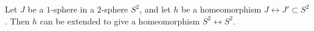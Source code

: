 Let $J$ be a $1$-sphere in a $2$-sphere $S^2$, and let $h$ be a homeomorphism $J \leftrightarrow J' \subset S^2$. Then $h$ can be extended to give a homeomorphism $S^2 \leftrightarrow S^2$.
